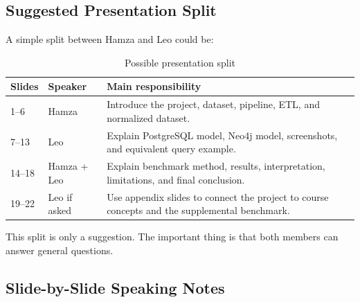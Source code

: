 \documentclass[11pt]{article}
\begin{document}
\subsection{Suggested Presentation Split}

A simple split between Hamza and Leo could be:

\begin{table}[H]
\centering
\small
\begin{tabular}{|p{}|p{}|p{}|}
\hline
\textbf{Slides} & \textbf{Speaker} & \textbf{Main responsibility} \\
\hline
1--6 & Hamza & Introduce the project, dataset, pipeline, ETL, and normalized dataset. \\
\hline
7--13 & Leo & Explain PostgreSQL model, Neo4j model, screenshots, and equivalent query example. \\
\hline
14--18 & Hamza + Leo & Explain benchmark method, results, interpretation, limitations, and final conclusion. \\
\hline
19--22 & Leo if asked & Use appendix slides to connect the project to course concepts and the supplemental benchmark. \\
\hline
\end{tabular}
\caption{Possible presentation split}
\end{table}

This split is only a suggestion.
The important thing is that both members can answer general questions.

\subsection{Slide-by-Slide Speaking Notes}
\end{document}
